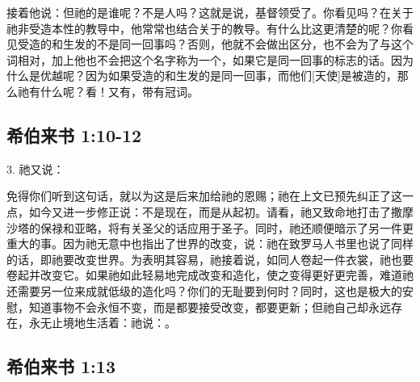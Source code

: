 接着他说：但祂的是谁呢？不是人吗？这就是说，基督领受了。你看见吗？在关于祂非受造本性的教导中，他常常也结合关于的教导。有什么比这更清楚的呢？你看见受造的和生发的不是同一回事吗？否则，他就不会做出区分，也不会为了与这个词相对，加上他也不会把这个名字称为一个，如果它是同一回事的标志的话。因为什么是优越呢？因为如果受造的和生发的是同一回事，而他们[天使]是被造的，那么祂有什么呢？看！又有，带有冠词。\par


\subsection{希伯来书 1:10-12}

3. 祂又说：\newline{}\par

免得你们听到这句话，就以为这是后来加给祂的恩赐；祂在上文已预先纠正了这一点，如今又进一步修正说：不是现在，而是从起初。请看，祂又致命地打击了撒摩沙塔的保禄和亚略，将有关圣父的话应用于圣子。同时，祂还顺便暗示了另一件更重大的事。因为祂无意中也指出了世界的改变，说：祂在致罗马人书里也说了同样的话，即祂要改变世界。为表明其容易，祂接着说，如同人卷起一件衣裳，祂也要卷起并改变它。如果祂如此轻易地完成改变和造化，使之变得更好更完善，难道祂还需要另一位来成就低级的造化吗？你们的无耻要到何时？同时，这也是极大的安慰，知道事物不会永恒不变，而是都要接受改变，都要更新；但祂自己却永远存在，永无止境地生活着：祂说：。\par


\subsection{希伯来书 1:13}


